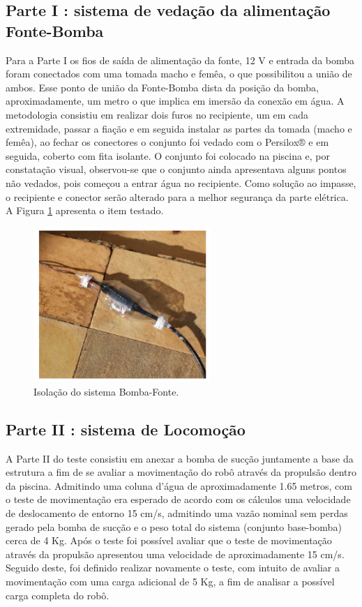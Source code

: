 \subsection{Parte I : sistema de vedação da alimentação Fonte-Bomba}
Para a Parte I os fios de saída de alimentação da fonte, 12 V e entrada da bomba foram conectados com uma tomada macho e femêa, o que possibilitou a união de ambos. Esse ponto de união da Fonte-Bomba dista da posição da bomba, aproximadamente, um metro o que implica em imersão da conexão em água. A metodologia consistiu em realizar dois furos no recipiente, um em cada extremidade, passar a fiação e em seguida instalar as partes da tomada (macho e femêa), ao fechar os conectores o conjunto foi vedado com o Persilox® e em seguida, coberto com fita isolante. O conjunto foi colocado na piscina e, por constatação visual, observou-se que o conjunto ainda apresentava alguns pontos não vedados, pois começou a entrar água no recipiente. Como solução ao impasse, o recipiente e conector serão alterado para a melhor segurança da parte elétrica. A Figura \ref{fig:isolation} apresenta o item testado.
\par
\begin{figure}[h]
  \centering
  \includegraphics[width=0.6\textwidth]{figures/isolation.png}
  \caption{Isolação do sistema Bomba-Fonte.}
  \label{fig:isolation}
\end{figure}
\FloatBarrier
\par

\subsection{Parte II : sistema de Locomoção}
A Parte II do teste consistiu em anexar a bomba de sucção juntamente a base da estrutura a fim de se avaliar a movimentação do robô através da propulsão dentro da piscina. Admitindo uma coluna d’água de aproximadamente 1.65 metros, com o teste de movimentação era esperado de acordo com os cálculos uma velocidade de deslocamento de entorno 15 cm/s, admitindo uma vazão nominal sem perdas gerado pela bomba de sucção e o peso total do sistema (conjunto base-bomba) cerca de 4 Kg. Após o teste foi possível avaliar que o teste de movimentação através da propulsão apresentou uma velocidade de aproximadamente 15 cm/s. Seguido deste, foi definido realizar novamente o teste, com intuito de avaliar a movimentação com uma carga adicional de 5 Kg, a fim de analisar a possível carga completa do robô.

